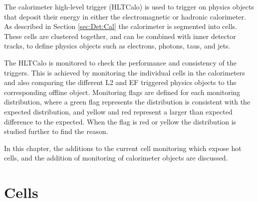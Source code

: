 The calorimeter high-level trigger (HLTCalo) is used to trigger on physics objects that deposit their energy in either the electromagnetic or hadronic calorimeter.
As described in Section \ref{sec:Det:Cal} the calorimeter is segmented into cells.
These cells are clustered together, and can be combined with inner detector tracks, to define physics objects such as electrons, photons, taus, and jets. 

The HLTCalo is monitored to check the performance and consistency of the triggers. 
This is achieved by monitoring the individual cells in the calorimeters and also comparing the different L2 and EF triggered physics objects to the corresponding offline object.
Monitoring flags are defined for each monitoring distribution, where a green flag represents the distribution is consistent with the expected distribution, and yellow and red represent a larger than expected difference to the expected. 
When the flag is red or yellow the distribution is studied further to find the reason.



%

In this chapter, the additions to the current cell monitoring which expose hot cells, and the addition of monitoring of calorimeter objects are discussed. 

\section{Cells}

